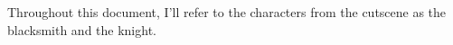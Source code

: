 Throughout this document, I'll refer to the characters from the cutscene as the blacksmith and the knight.
